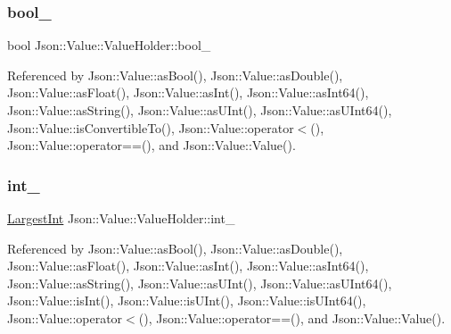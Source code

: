 \subsubsection{\texorpdfstring{bool\+\_\+}{bool\_}}
{\footnotesize\ttfamily bool Json\+::\+Value\+::\+Value\+Holder\+::bool\+\_\+}



Referenced by Json\+::\+Value\+::as\+Bool(), Json\+::\+Value\+::as\+Double(), Json\+::\+Value\+::as\+Float(), Json\+::\+Value\+::as\+Int(), Json\+::\+Value\+::as\+Int64(), Json\+::\+Value\+::as\+String(), Json\+::\+Value\+::as\+U\+Int(), Json\+::\+Value\+::as\+U\+Int64(), Json\+::\+Value\+::is\+Convertible\+To(), Json\+::\+Value\+::operator$<$(), Json\+::\+Value\+::operator==(), and Json\+::\+Value\+::\+Value().

\mbox{\label{unionJson_1_1Value_1_1ValueHolder_adbfb384301298844ed955ba5cf6015a0_adbfb384301298844ed955ba5cf6015a0}} 
\subsubsection{\texorpdfstring{int\+\_\+}{int\_}}
{\footnotesize\ttfamily \hyperlink{classJson_1_1Value_a1cbb82642ed05109b9833e49f042ece7_a1cbb82642ed05109b9833e49f042ece7}{Largest\+Int} Json\+::\+Value\+::\+Value\+Holder\+::int\+\_\+}



Referenced by Json\+::\+Value\+::as\+Bool(), Json\+::\+Value\+::as\+Double(), Json\+::\+Value\+::as\+Float(), Json\+::\+Value\+::as\+Int(), Json\+::\+Value\+::as\+Int64(), Json\+::\+Value\+::as\+String(), Json\+::\+Value\+::as\+U\+Int(), Json\+::\+Value\+::as\+U\+Int64(), Json\+::\+Value\+::is\+Int(), Json\+::\+Value\+::is\+U\+Int(), Json\+::\+Value\+::is\+U\+Int64(), Json\+::\+Value\+::operator$<$(), Json\+::\+Value\+::operator==(), and Json\+::\+Value\+::\+Value().

\mbox{\label{unionJson_1_1Value_1_1ValueHolder_a1e7a5b86d4f52234f55c847ad1ce389a_a1e7a5b86d4f52234f55c847ad1ce389a}} 
